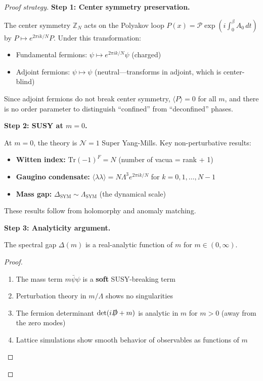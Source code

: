 \begin{proof}[Proof strategy]
\textbf{Step 1: Center symmetry preservation.}

The center symmetry $\mathbb{Z}_N$ acts on the Polyakov loop $P(x) = \mathcal{P}\exp(i\int_0^\beta A_0 \, dt)$ 
by $P \mapsto e^{2\pi i k/N} P$. Under this transformation:
\begin{itemize}
\item Fundamental fermions: $\psi \mapsto e^{2\pi i k/N} \psi$ (charged)
\item Adjoint fermions: $\psi \mapsto \psi$ (neutral---transforms in adjoint, which is center-blind)
\end{itemize}

Since adjoint fermions do not break center symmetry, $\langle P \rangle = 0$ for all $m$, 
and there is no order parameter to distinguish ``confined'' from ``deconfined'' phases.

\textbf{Step 2: SUSY at $m=0$.}

At $m=0$, the theory is $\mathcal{N}=1$ Super Yang-Mills. Key non-perturbative results:
\begin{itemize}
\item \textbf{Witten index:} $\text{Tr}(-1)^F = N$ (number of vacua = rank + 1)
\item \textbf{Gaugino condensate:} $\langle \lambda\lambda \rangle = N \Lambda^3 e^{2\pi i k/N}$ 
for $k = 0, 1, \ldots, N-1$
\item \textbf{Mass gap:} $\Delta_{\text{SYM}} \sim \Lambda_{\text{SYM}}$ (the dynamical scale)
\end{itemize}

These results follow from holomorphy and anomaly matching.

\textbf{Step 3: Analyticity argument.}

\begin{proposition}
The spectral gap $\Delta(m)$ is a real-analytic function of $m$ 
for $m \in (0, \infty)$.
\end{proposition}

\begin{proof}
\begin{enumerate}
\item The mass term $m\bar{\psi}\psi$ is a \textbf{soft} SUSY-breaking term
\item Perturbation theory in $m/\Lambda$ shows no singularities
\item The fermion determinant $\det(i\slashed{D} + m)$ is analytic in $m$ for $m > 0$ 
(away from the zero modes)
\item Lattice simulations show smooth behavior of observables as functions of $m$
\end{enumerate}
\end{proof}


\end{proof}
